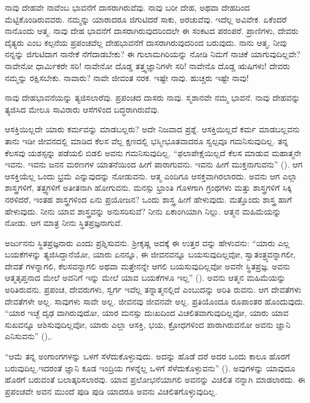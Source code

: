 ನಾವು ದೇಹವೇ ನಾವೆಂಬ ಭಾವನೆಗೆ ದಾಸರಾಗಿರುವೆವು. ನಾವು ಬರೀ ದೇಹ, ಅಥವಾ ದೇಹದಿಂದ ಮೆಟ್ಟಿಕೊಂಡಿರುವವರು. ನಮ್ಮನ್ನು ಯಾರಾದರೂ ಜಿಗುಟಿದರೆ ಸಾಕು, ಅರಚುವೆವು. ಇದೆಲ್ಲ ಅವಿವೇಕ. ಏಕೆಂದರೆ ನಾನೊಂದು ಆತ್ಮ. ನಾವು ದೇಹ ಭಾವನೆಗೆ ದಾಸರಾಗಿರುವುದರಿಂದಲೇ ಈ ಸಂಕಟದ ಪರಂಪರೆ. ಪ್ರಾಣಿಗಳು, ದೇವರು ದೈತ್ಯರು ಎಂಬ ಕಲ್ಪನೆಯ ಪ್ರಪಂಚವೆಲ್ಲ ದೇಹಭಾವನೆಗೆ ದಾಸರಾಗಿರುವುದರಿಂದ ಬರುವುದು. ನಾನು ಆತ್ಮ, ನೀವು ನನ್ನನ್ನು ಜಿಗುಟಿದಾಗ ನಾನೇಕೆ ನೆಗೆದಾಡಬೇಕು? ಈ ಗುಲಾಮಗಿರಿಯನ್ನು ನೋಡಿ ನಿಮಗೆ ನಾಚಿಕೆ ಯಾಗುವುದಿಲ್ಲವೇ? ನಾವೇನೋ ಧಾರ್ಮಿಕರೇ ಸರಿ! ನಾವೇನೋ ದೊಡ್ಡ ತತ್ತ್ವಜ್ಞಾನಿಗಳೇ ಸರಿ! ನಾವೇನೊ ದೊಡ್ಡ ಋಷಿಗಳು! ದೇವರು ನಮ್ಮನ್ನು ರಕ್ಷಿಸಬೇಕು. ನಾವಾರು? ನಾವೇ ಜೀವಂತ ನರಕ. ಇಷ್ಟೇ ನಾವು. ಹುಚ್ಚರು ಇಷ್ಟೇ ನಾವು!

ನಾವು ದೇಹಭಾವನೆಯನ್ನು ತ್ಯಜಿಸಲಾರೆವು. ಪ್ರಪಂಚದ ದಾಸರು ನಾವು. ಸ್ಮಶಾನವೇ ನಮ್ಮ ಭಾವನೆ. ನಾವು ದೇಹವನ್ನು ತ್ಯಜಿಸಿದ ಮೇಲೂ ಸಾವಿರಾರು ಆಸೆಗಳಿಂದ ಬದ್ಧರಾಗಿರುವೆವು.

ಆಸಕ್ತಿಯಿಲ್ಲದೇ ಯಾರು ಕರ್ಮವನ್ನು ಮಾಡಬಲ್ಲರು? ಅದೇ ನಿಜವಾದ ಪ್ರಶ್ನೆ. ಆಸಕ್ತಿಯಿಲ್ಲದೆ ಕರ್ಮ ಮಾಡಬಲ್ಲವನು ತಾನು ಇಡೀ ಜೀವನದಲ್ಲಿ ಮಾಡಿದ ಕೆಲಸ ವೆಲ್ಲ ಕ್ಷಣದಲ್ಲಿ ಭಸ್ಮೀಭೂತವಾದರೂ ಸ್ವಲ್ಪವೂ ಗಮನಿಸುವುದಿಲ್ಲ. ತನ್ನ ಕೆಲಸವು ಯಶಸ್ಸನ್ನು ಪಡೆಯಲಿ ಬಿಡಲಿ ಅವನು ಗಮನಿಸುವುದಿಲ್ಲ. “ಫಲಾಪೇಕ್ಷೆಯಿಲ್ಲದೆ ಕೆಲಸ ಮಾಡುವ ಮಹಾತ್ಮನೇ ಇವನು. ಇವನು ಜನನ ಮರಣಗಳ ಯಾತನೆಯಿಂದ ಹೀಗೆ ಪಾರಾಗುವನು. ಇವನು ಹೀಗೆ ಮುಕ್ತನಾಗುವನು” (). ಆಗ ಆಸಕ್ತಿಯೆಲ್ಲ ಒಂದು ಭ್ರಮೆ ಎನ್ನುವುದನ್ನು ನೋಡುವನು. ಆತ್ಮ ಎಂದಿಗೂ ಆಸಕ್ತವಾಗಿರಲಾರದು. ಅವನು ಆಗ ಎಲ್ಲಾ ಶಾಸ್ತ್ರಗಳಿಗೆ, ತತ್ತ್ವಗಳಿಗೆ ಅತೀತನಾಗಿ ಹೋಗುವನು. ಮನಸ್ಸು ಭ್ರಾಂತಿ ಗೊಳಗಾಗಿ ಗ್ರಂಥಗಳು ಮತ್ತು ಶಾಸ್ತ್ರಗಳಿಗೆ ಸಿಕ್ಕಿ ನರಳಿದರೆ, ಇಂತಹ ಶಾಸ್ತ್ರಗಳಿಂದ ಏನು ಪ್ರಯೋಜನ? ಒಂದು ಶಾಸ್ತ್ರ ಹೀಗೆ ಹೇಳುವುದು. ಮತ್ತೊಂದು ಶಾಸ್ತ್ರ ಹಾಗೆ ಹೇಳುವುದು. ನೀನು ಯಾವ ಶಾಸ್ತ್ರವನ್ನು ಅನುಸರಿಸುವೆ? ನೀನು ಏಕಾಂಗಿಯಾಗಿ ನಿಲ್ಲು. ಆತ್ಮನ ಮಹಿಮೆಯನ್ನು ನೋಡು. ಆಗ ಮಾತ್ರ ನೀನು ಸ್ಥಿತಪ್ರಜ್ಞನಾಗುವೆ.

ಅರ್ಜುನನು ಸ್ಥಿತಪ್ರಜ್ಞನಾರು ಎಂದು ಪ್ರಶ್ನಿಸುವನು. ಶ‍್ರೀಕೃಷ್ಣ ಅದಕ್ಕೆ ಈ ಉತ್ತರ ವನ್ನು ಹೇಳುವನು: “ಯಾರು ಎಲ್ಲ ಬಯಕೆಗಳನ್ನು ತ್ಯಜಿಸಿದ್ದಾನೆಯೋ, ಯಾರು ಏನನ್ನೂ, ಈ ಜೀವನವನ್ನೂ ಬಯಸುವುದಿಲ್ಲವೋ, ಸ್ವಾತಂತ್ರ್ಯವನ್ನಾಗಲೀ, ದೇವತೆ ಗಳನ್ನಾಗಲಿ, ಕೆಲಸವನ್ನಾಗಲಿ ಅಥವಾ ಮತ್ತೇನನ್ನೇ ಆಗಲಿ ಬಯಸುವುದಿಲ್ಲವೋ ಅವನೇ ಸ್ಥಿತಪ್ರಜ್ಞ. ಅವನು ಆತ್ಮತೃಪ್ತನಾದ ಮೇಲೆ ಅವನಿಗೆ ಇನ್ನು ಮೇಲೆ ಯಾವ ಬಯಕೆಗಳೂ ಇಲ್ಲ” (). ಅವನು ಆತ್ಮನ ಮಹಿಮೆಯನ್ನು ಅರಿತಿರುವನು. ಪ್ರಪಂಚ, ದೇವರುಗಳು, ಸ್ವರ್ಗ ಇವೆಲ್ಲ ತನ್ನಾತ್ಮನಲ್ಲಿದೆ ಎಂಬುದನ್ನು ಅರಿತಿ ರುವನು. ಆಗ ದೇವತೆಗಳು ದೇವತೆಗಳೇ ಅಲ್ಲ. ಸಾವುಗಳು ಸಾವೇ ಅಲ್ಲ. ಜೀವನವು ಜೀವನವೇ ಅಲ್ಲ. ಪ್ರತಿಯೊಂದೂ ರೂಪಾಂತರ ಹೊಂದುವುದು. “ಯಾರ ಇಚ್ಛೆ ದೃಢ ವಾಗಿರುವುದೋ, ಯಾರ ಮನಸ್ಸು ದುಃಖದಿಂದ ವಿಚಲಿತವಾಗುವುದಿಲ್ಲವೋ, ಯಾರು ಯಾವ ಸುಖವನ್ನೂ ಆಶಿಸುವುದಿಲ್ಲವೋ, ಯಾರು ಎಲ್ಲಾ ಆಸಕ್ತಿ, ಭಯ, ಕ್ರೋಧಗಳಿಂದ ಪಾರಾಗಿರುವನೋ ಅವನು ಜ್ಞಾನಿ ಎನಿಸುವನು” (),.

“ಆಮೆ ತನ್ನ ಅಂಗಾಂಗಗಳನ್ನು ಒಳಗೆ ಸೆಳೆದುಕೊಳ್ಳುವುದು. ಅದನ್ನು ಹೊಡೆ ದರೆ ಅದರ ಒಂದು ಕಾಲೂ ಹೊರಗೆ ಬರುವುದಿಲ್ಲ.ಇದರಂತೆ ಜ್ಞಾನಿ ಕೂಡ ಇಂದ್ರಿಯ ಗಳನ್ನೆಲ್ಲ ಒಳಗೆ ಸೆಳೆದುಕೊಳ್ಳುವನು” (). ಅವುಗಳನ್ನು ಯಾವುದೂ ಹೊರಗೆ ಬರುವಂತೆ ಬಲಾತ್ಕರಿಸಲಾರವು. ಯಾವ ಪ್ರಲೋಭನೆಯಾಗಲಿ ಅವನನ್ನು ವಿಚಲಿತ ನನ್ನಾಗಿ ಮಾಡಲಾರದು. ಈ ಪ್ರಪಂಚವೇ ಅವನ ಮುಂದೆ ಪುಡಿ ಪುಡಿ ಯಾದರೂ ಅವನು ವಿಚಲಿತಗೊಳ್ಳುವುದಿಲ್ಲ.


